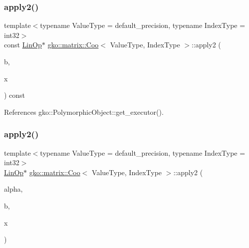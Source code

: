 \subsubsection{\texorpdfstring{apply2()}{apply2()}\hspace{0.1cm}{\footnotesize\ttfamily [2/4]}}
{\footnotesize\ttfamily template$<$typename Value\+Type = default\+\_\+precision, typename Index\+Type = int32$>$ \\
const \hyperlink{classgko_1_1LinOp}{Lin\+Op}$\ast$ \hyperlink{classgko_1_1matrix_1_1Coo}{gko\+::matrix\+::\+Coo}$<$ Value\+Type, Index\+Type $>$\+::apply2 (\begin{DoxyParamCaption}\item[{const \hyperlink{classgko_1_1LinOp}{Lin\+Op} $\ast$}]{b,  }\item[{\hyperlink{classgko_1_1LinOp}{Lin\+Op} $\ast$}]{x }\end{DoxyParamCaption}) const\hspace{0.3cm}{\ttfamily [inline]}}







References gko\+::\+Polymorphic\+Object\+::get\+\_\+executor().

\mbox{\label{classgko_1_1matrix_1_1Coo_a549dafbe9245e3fcef3b02c4d6914c84}} 
\subsubsection{\texorpdfstring{apply2()}{apply2()}\hspace{0.1cm}{\footnotesize\ttfamily [3/4]}}
{\footnotesize\ttfamily template$<$typename Value\+Type = default\+\_\+precision, typename Index\+Type = int32$>$ \\
\hyperlink{classgko_1_1LinOp}{Lin\+Op}$\ast$ \hyperlink{classgko_1_1matrix_1_1Coo}{gko\+::matrix\+::\+Coo}$<$ Value\+Type, Index\+Type $>$\+::apply2 (\begin{DoxyParamCaption}\item[{const \hyperlink{classgko_1_1LinOp}{Lin\+Op} $\ast$}]{alpha,  }\item[{const \hyperlink{classgko_1_1LinOp}{Lin\+Op} $\ast$}]{b,  }\item[{\hyperlink{classgko_1_1LinOp}{Lin\+Op} $\ast$}]{x }\end{DoxyParamCaption})\hspace{0.3cm}{\ttfamily [inline]}}



